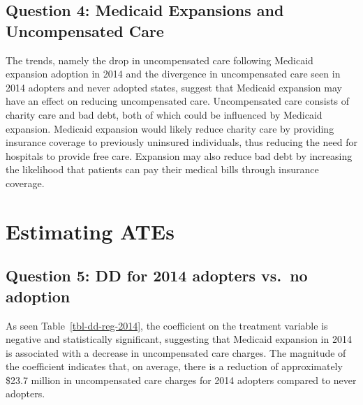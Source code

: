 \documentclass[
  letterpaper,
  DIV=11,
  numbers=noendperiod]{scrartcl}
\begin{document}
\subsection{Question 4: Medicaid Expansions and Uncompensated
Care}\label{question-4-medicaid-expansions-and-uncompensated-care}

The trends, namely the drop in uncompensated care following Medicaid
expansion adoption in 2014 and the divergence in uncompensated care seen
in 2014 adopters and never adopted states, suggest that Medicaid
expansion may have an effect on reducing uncompensated care.
Uncompensated care consists of charity care and bad debt, both of which
could be influenced by Medicaid expansion. Medicaid expansion would
likely reduce charity care by providing insurance coverage to previously
uninsured individuals, thus reducing the need for hospitals to provide
free care. Expansion may also reduce bad debt by increasing the
likelihood that patients can pay their medical bills through insurance
coverage.

\section{Estimating ATEs}\label{estimating-ates}

\subsection{Question 5: DD for 2014 adopters vs.~no
adoption}\label{question-5-dd-for-2014-adopters-vs.-no-adoption}

As seen Table~\ref{tbl-dd-reg-2014}, the coefficient on the treatment
variable is negative and statistically significant, suggesting that
Medicaid expansion in 2014 is associated with a decrease in
uncompensated care charges. The magnitude of the coefficient indicates
that, on average, there is a reduction of approximately \$23.7 million
in uncompensated care charges for 2014 adopters compared to never
adopters.
\end{document}
